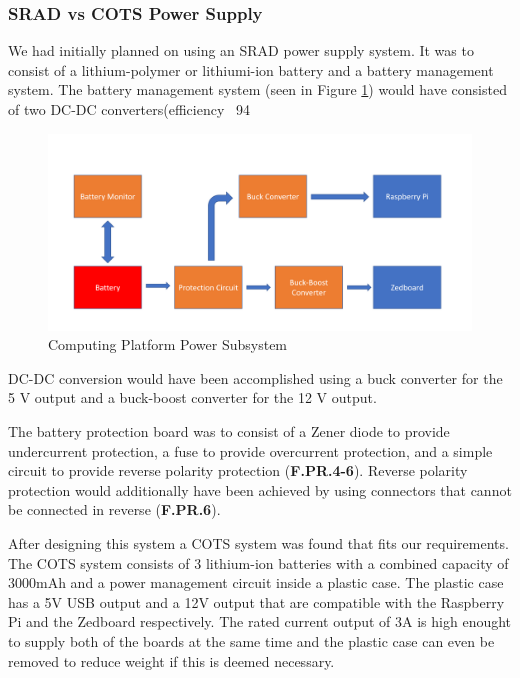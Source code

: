 \subsubsection{SRAD vs COTS Power Supply}
We had initially planned on using an SRAD power supply system. It was to consist of a lithium-polymer or lithiumi-ion battery and a battery management system. The battery management system (seen in Figure \ref{powerdiag}) would have consisted of two DC-DC converters(efficiency ~94%

\begin{figure}[H]
\centering
\includegraphics[width=15cm]{img/Power_Diagram.png}
\caption{Computing Platform Power Subsystem}
\label{powerdiag}
\end{figure}

DC-DC conversion would have been accomplished using a buck converter for the 5 V output and a buck-boost converter for the 12 V output. 

The battery protection board was to consist of a Zener diode to provide undercurrent protection, a fuse to provide overcurrent protection, and a simple circuit to provide reverse polarity protection (\textbf{F.PR.4-6}). Reverse polarity protection would additionally have been achieved by using connectors that cannot be connected in reverse (\textbf{F.PR.6}). 

After designing this system a COTS system was found that fits our requirements. The COTS system consists of 3 lithium-ion batteries with a combined capacity of 3000mAh and a power management circuit inside a plastic case. The plastic case has a 5V USB output and a 12V output that are compatible with the Raspberry Pi and the Zedboard respectively. The rated current output of 3A is high enought to supply both of the boards at the same time and the plastic case can even be removed to reduce weight if this is deemed necessary.

